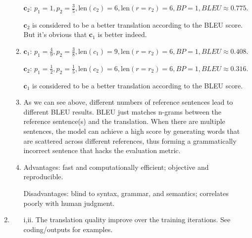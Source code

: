 \documentclass[11pt, a4paper, oneside]{article}
\begin{document}
\begin{enumerate}[label=(\alph*), left=0pt, labelsep=1em, itemsep=1em]
\begin{enumerate}[label=\roman*., left=0pt, labelsep=1em, itemsep=1em]
    $\mathbf c_2$: $p_1 = 1, p_2 = \frac{3}{5}, \mathrm{len}(c_2)=6, \mathrm{len}(r = r_2)=6, BP=1, BLEU\approx0.775.$

    $\mathbf c_2$ is considered to be a better translation according to the BLEU score. But it's obvious that 
    $\mathbf c_1$ is better indeed.
    \item $\mathbf c_1$: $p_1 = \frac{4}{9}, p_2 = \frac{3}{8}, \mathrm{len}(c_1)=9, \mathrm{len}(r = r_2)=6, BP=1, BLEU\approx0.408.$
    
    $\mathbf c_2$: $p_1 = \frac{1}{2}, p_2 = \frac{1}{5}, \mathrm{len}(c_2)=6, \mathrm{len}(r = r_2)=6, BP=1, BLEU\approx0.316.$

    $\mathbf c_1$ is considered to be a better translation according to the BLEU score.

    \item As we can see above, different numbers of reference sentences lead to different BLEU results.
    BLEU just matches n-grams between the reference sentence(s) and the translation.
    When there are multiple sentences, the model can achieve a high score by generating words 
    that are scattered across different references, thus forming a grammatically
    incorrect sentence that hacks the evaluation metric.

    \item Advantages: fast and computationally efficient; objective and reproducible.
    
    Disadvantages: blind to syntax, grammar, and semantics; correlates poorly with human judgment.
    \end{enumerate}

    \item 
    \begin{enumerate}[label=\roman*., left=0pt, labelsep=1em, itemsep=1em]
    \item[i,ii.]
    The translation quality improve over the training iterations. See coding/outputs for examples.

    \end{enumerate}

\end{enumerate}
\end{document}
